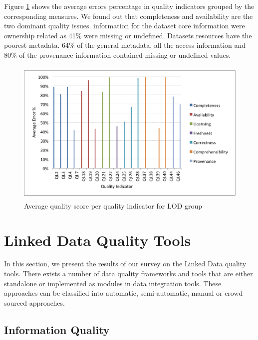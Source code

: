 \documentclass[onecolumn, crcready]{iosart2c}
\begin{document}
Figure \ref{fig:2} shows the average errors percentage in quality indicators grouped by the corresponding measures. We found out that completeness and availability are the two dominant quality issues.  information for the dataset core information were ownership related as 41\% were missing or undefined. Datasets resources have the poorest metadata. 64\% of the general metadata, all the access information and 80\% of the provenance information contained missing or undefined values.

\begin{figure}[ht!]
  \centering
    \includegraphics[height=7cm, width=13cm]{LOD_quality_indicators_grouped.png}
  \caption{Average quality score per quality indicator for LOD group}
  \label{fig:2}
\end{figure}

\section{Linked Data Quality Tools}
In this section, we present the results of our survey on the Linked Data quality tools. There exists a number of data quality frameworks and tools that are either standalone or implemented as modules in data integration tools. These approaches can be classified into automatic, semi-automatic, manual or crowd sourced approaches.

\subsection{Information Quality}
\end{document}
